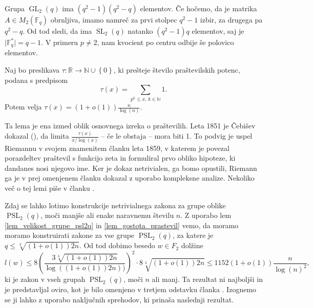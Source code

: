     \begin{dokaz}
    Grupa $\operatorname{GL}_2(q)$ ima $(q^2  -1)(q^2 - q)$ elementov. Če hočemo, da je matrika $A \in M_2(\mathbb{F}_q)$ obrnljiva, imamo namreč za prvi stolpec $q^2 -1$ izbir, za drugega pa $q^2 - q$.
    Od tod sledi, da ima $\operatorname{SL}_2(q)$ natanko $(q^2  -1)q$ elementov, saj je $\lvert \mathbb{F}_q^{*} \rvert = q-1$. V primeru $p \neq 2$, nam kvocient po centru odbije še polovico elementov.   
    \end{dokaz}
    
    \begin{lema}
    \label{lem_gostota_prastevil}
    Naj bo preslikava $\tau : \mathbb{R} \to \mathbb{N} \cup \left\{ 0\right\}$, ki prešteje število praštevilskih potenc, podana s predpisom \begin{equation*}
    \tau(x) = \sum_{p^{k} \le x, \, k \in \mathbb{N}} 1.
    \end{equation*}  
     Potem velja $\tau(x) = (1 + o(1)) \frac{n}{\log(n)}$.     
    \end{lema}
    Ta lema je ena izmed oblik osnovnega izreka o praštevilih. Leta     1851 je Čebišev dokazal (\cite[str.~4--5]{Granville_1993}), da limita $\frac{\tau(x)}{x / \log(x)}$ -- če le obstaja -- mora biti 1. To podvig je uspel Riemannu v svojem znamenitem članku \cite{Riemann_1859} leta 1859, v katerem je povezal porazdeltev praštevil s funkcijo zeta in formuliral prvo obliko hipoteze, ki dandanes nosi njegovo ime.
    Ker je dokaz netrivialen, ga bomo opustili, Riemann ga je v prej omenjenem članku dokazal z uporabo kompleksne analize. 
    Nekoliko več o tej lemi piše v članku \cite{Kozma_Thom_2016}.            
   
    Zdaj se lahko lotimo konstrukcije netrivialnega zakona za grupe oblike $\operatorname{PSL}_2(q)$, moči manjše ali enake naravnemu številu $n$. Z uporabo lem \ref{lem_velikost_grupe_psl2q} in \ref{lem_gostota_prastevil}
    vemo, da moramo moramo konstruirati zakone za vse grupe $\operatorname{PSL}_2(q)$, za katere je $q \le \sqrt[3]{(1 + o(1)) 2n}$. Od tod dobimo besedo $w \in F_2$ dolžine \begin{equation*}
    l(w) \le 8 \left( \frac{3 \sqrt[3]{(1 + o(1)) 2n}}{\log((1 + o(1)) 2n))}  \right)^2 \cdot 8 \sqrt[3]{(1 + o(1)) 2n} \le 1152 (1 + o(1)) \frac{n}{\log(n)^2},
    \end{equation*}  
    ki je zakon v vseh grupah $\operatorname{PSL}_2(q)$, moči $n$ ali manj. Ta rezultat ni najboljši in je predstavljal oviro, kot je bilo omenjeno v tretjem odstavku članka \cite[str.~6]{Bradford_Thom_2017}.
    Izognemo se ji lahko z uporabo naključnih sprehodov, ki prinaša naslednji rezultat.

